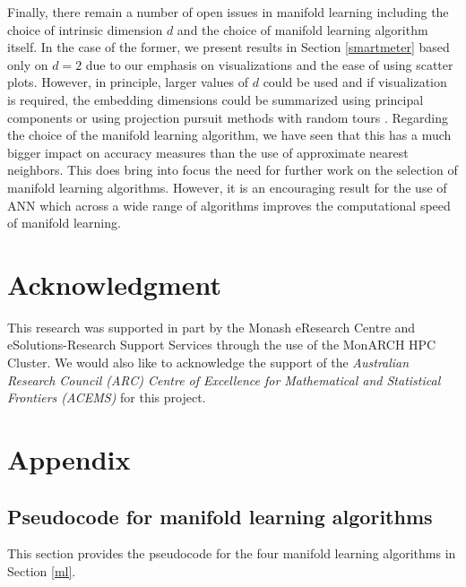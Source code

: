 \documentclass[11pt,a4paper,]{article}
\begin{document}
Finally, there remain a number of open issues in manifold learning including the choice of intrinsic dimension \(d\) and the choice of manifold learning algorithm itself. In the case of the former, we present results in Section \ref{smartmeter} based only on \(d=2\) due to our emphasis on visualizations and the ease of using scatter plots. However, in principle, larger values of \(d\) could be used and if visualization is required, the embedding dimensions could be summarized using principal components or using projection pursuit methods with random tours \autocite{Cook1995,Laa2020}. Regarding the choice of the manifold learning algorithm, we have seen that this has a much bigger impact on accuracy measures than the use of approximate nearest neighbors. This does bring into focus the need for further work on the selection of manifold learning algorithms. However, it is an encouraging result for the use of ANN which across a wide range of algorithms improves the computational speed of manifold learning.

\hypertarget{acknowledgment}{%
\section*{Acknowledgment}\label{acknowledgment}}

This research was supported in part by the Monash eResearch Centre and eSolutions-Research Support Services through the use of the MonARCH HPC Cluster.
We would also like to acknowledge the support of the \emph{Australian Research Council (ARC) Centre of Excellence for Mathematical and Statistical Frontiers (ACEMS)} for this project.

\clearpage

\printbibliography

\clearpage\appendix
\section{Appendix}
\def\thepage{A\arabic{page}}

\subsection{Pseudocode for manifold learning algorithms}
\label{sec:mlalg}
This section provides the pseudocode for the four manifold learning algorithms in Section \ref{ml}.
\end{document}
